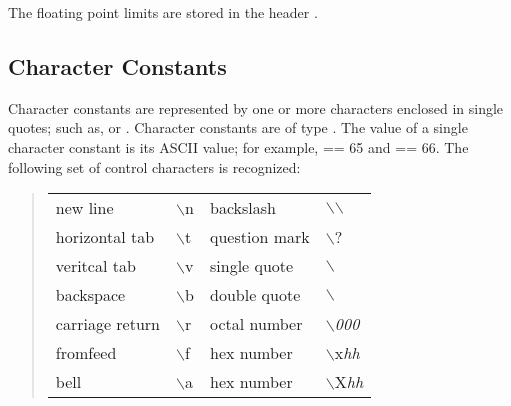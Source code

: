 

The floating point limits are stored in the header .

\subsection{Character Constants}
\label{sec:CharacterConstants}
Character constants are represented by one or more characters 
enclosed in single quotes; such as,  or
. Character constants are of type . 
The value of a single character constant is its ASCII value; for
example,  == 65 and  == 66. The following set of control
characters is recognized:

\begin{quote}
\begin{tabular}{llll}
new line          &  $\backslash$n  & backslash &  $\backslash$$\backslash$\\
horizontal tab    &  $\backslash$t  & question mark & $\backslash$? \\
veritcal tab      &  $\backslash$v  & single quote  & $\backslash$\T{'} \\
backspace         &  $\backslash$b  & double quote  & $\backslash$\T{''} \\
carriage return   &  $\backslash$r  & octal number  & $\backslash${\it 000} \\
fromfeed          &  $\backslash$f  & hex number    & $\backslash$x{\it hh} \\
bell              &  $\backslash$a  & hex number    & $\backslash$X{\it hh}
\end{tabular} 
\end{quote}  

